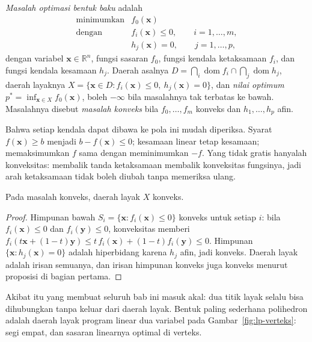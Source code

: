 \begin{definisi}
\emph{Masalah optimasi bentuk baku} adalah
\[
  \begin{array}{ll}
  \text{minimumkan} & f_{0}(\mathbf{x})\\
  \text{dengan} & f_{i}(\mathbf{x})\le0,\qquad i=1,\dots,m,\\
                & h_{j}(\mathbf{x})=0,\qquad j=1,\dots,p,
  \end{array}
\]
dengan variabel $\mathbf{x}\in\mathbb{R}^{n}$, fungsi sasaran $f_{0}$, fungsi kendala
ketaksamaan $f_{i}$, dan fungsi kendala kesamaan $h_{j}$. Daerah asalnya
$D=\bigcap_{i}\operatorname{dom}f_{i}\cap\bigcap_{j}\operatorname{dom}h_{j}$, daerah
layaknya $X=\{\mathbf{x}\in D:f_{i}(\mathbf{x})\le0,\ h_{j}(\mathbf{x})=0\}$, dan
\emph{nilai optimum} $p^{*}=\inf_{\mathbf{x}\in X}f_{0}(\mathbf{x})$, boleh
$-\infty$ bila masalahnya tak terbatas ke bawah. Masalahnya disebut \emph{masalah
konveks} bila $f_{0},\dots,f_{m}$ konveks dan $h_{1},\dots,h_{p}$ afin.
\end{definisi}

Bahwa setiap kendala dapat dibawa ke pola ini mudah diperiksa. Syarat
$f(\mathbf{x})\ge b$ menjadi $b-f(\mathbf{x})\le0$; kesamaan linear tetap kesamaan;
memaksimumkan $f$ sama dengan meminimumkan $-f$. Yang tidak gratis hanyalah konveksitas:
membalik tanda ketaksamaan membalik konveksitas fungsinya, jadi arah ketaksamaan tidak
boleh diubah tanpa memeriksa ulang.

\begin{akibat}
Pada masalah konveks, daerah layak $X$ konveks.
\end{akibat}

\begin{proof}
Himpunan bawah $S_{i}=\{\mathbf{x}:f_{i}(\mathbf{x})\le0\}$ konveks untuk setiap $i$:
bila $f_{i}(\mathbf{x})\le0$ dan $f_{i}(\mathbf{y})\le0$, konveksitas memberi
$f_{i}(t\mathbf{x}+(1-t)\mathbf{y})\le t\,f_{i}(\mathbf{x})+(1-t)f_{i}(\mathbf{y})\le0$.
Himpunan $\{\mathbf{x}:h_{j}(\mathbf{x})=0\}$ adalah hiperbidang karena $h_{j}$ afin,
jadi konveks. Daerah layak adalah irisan semuanya, dan irisan himpunan konveks juga konveks
menurut proposisi di bagian pertama.
\end{proof}

Akibat itu yang membuat seluruh bab ini masuk akal: dua titik layak selalu bisa
dihubungkan tanpa keluar dari daerah layak. Bentuk paling sederhana polihedron adalah
daerah layak program linear dua variabel pada Gambar~\ref{fig:lp-verteks}: segi empat,
dan sasaran linearnya optimal di verteks.

